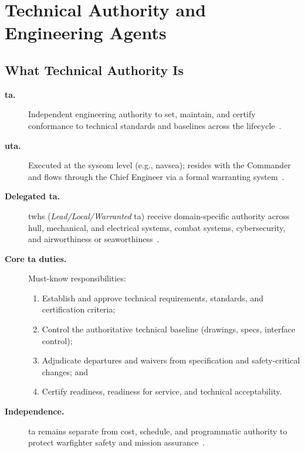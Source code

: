\documentclass[../main.tex]{subfiles}
\begin{document}

\section{Technical Authority and Engineering Agents}
\minibib
\subsection{What Technical Authority Is}

\begin{description}
	\item[\textbf{\ac{ta}.}] Independent engineering authority to set, maintain, and certify conformance to technical standards and baselines across the lifecycle~\autocite{SECNAV5400-15D}.
	\item[\textbf{\ac{uta}.}] Executed at the \ac{syscom} level (e.g., \ac{navsea}); resides with the Commander and flows through the Chief Engineer via a formal warranting system~\autocite{edo-2-1-5-technical-authority-2025}.
	\item[\textbf{Delegated \ac{ta}.}] \acp{twh} (\emph{Lead/Local/Warranted} \ac{ta}) receive domain-specific authority across hull, mechanical, and electrical systems, combat systems, cybersecurity, and airworthiness or seaworthiness~\autocite{edo-2-1-5-technical-authority-2025}.
	\item[\textbf{Core \ac{ta} duties.}] Must-know responsibilities:
      \begin{enumerate}
        \item Establish and approve technical requirements, standards, and certification criteria;
        \item Control the authoritative technical baseline (drawings, specs, interface control);
        \item Adjudicate departures and waivers from specification and safety-critical changes; and
        \item Certify readiness, readiness for service, and technical acceptability.
      \end{enumerate}
	\item[\textbf{Independence.}] \ac{ta} remains separate from cost, schedule, and programmatic authority to protect warfighter safety and mission assurance~\autocite{SECNAV5400-15D}.
\end{description}
\end{document}
